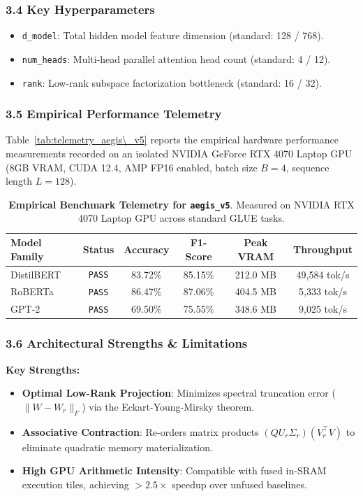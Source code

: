 \subsubsection*{3.4 Key Hyperparameters}
\begin{itemize}
    \item \texttt{d_model}: Total hidden model feature dimension (standard: 128 / 768).
    \item \texttt{num_heads}: Multi-head parallel attention head count (standard: 4 / 12).
    \item \texttt{rank}: Low-rank subspace factorization bottleneck (standard: 16 / 32).
\end{itemize}

\subsubsection*{3.5 Empirical Performance Telemetry}
Table~\ref{tab:telemetry_aegis\_v5} reports the empirical hardware performance measurements recorded on an isolated NVIDIA GeForce RTX 4070 Laptop GPU (8GB VRAM, CUDA 12.4, AMP FP16 enabled, batch size $B=4$, sequence length $L=128$).

\begin{table}[h]
\centering
\small
\caption{\textbf{Empirical Benchmark Telemetry for \texttt{aegis\_v5}}. Measured on NVIDIA RTX 4070 Laptop GPU across standard GLUE tasks.}
\label{tab:telemetry_aegis_v5}
\begin{tabular*}{\columnwidth}{@{\extracolsep{\fill}}lccccc}
\toprule
\textbf{Model Family} & \textbf{Status} & \textbf{Accuracy} & \textbf{F1-Score} & \textbf{Peak VRAM} & \textbf{Throughput} \\
\midrule
DistilBERT & \texttt{PASS} & 83.72\% & 85.15\% & 212.0 MB & 49,584 tok/s \\
RoBERTa    & \texttt{PASS} & 86.47\% & 87.06\% & 404.5 MB & 5,333 tok/s \\
GPT-2      & \texttt{PASS} & 69.50\% & 75.55\% & 348.6 MB & 9,025 tok/s \\
\bottomrule
\end{tabular*}
\end{table}

\subsubsection*{3.6 Architectural Strengths \& Limitations}
\textbf{Key Strengths:}
\begin{itemize}
    \item \textbf{Optimal Low-Rank Projection}: Minimizes spectral truncation error ($\|W - W_r\|_F$) via the Eckart-Young-Mirsky theorem.
    \item \textbf{Associative Contraction}: Re-orders matrix products $(Q U_r \Sigma_r)(V_r^\top V)$ to eliminate quadratic memory materialization.
    \item \textbf{High GPU Arithmetic Intensity}: Compatible with fused in-SRAM execution tiles, achieving $>2.5\times$ speedup over unfused baselines.
\end{itemize}

